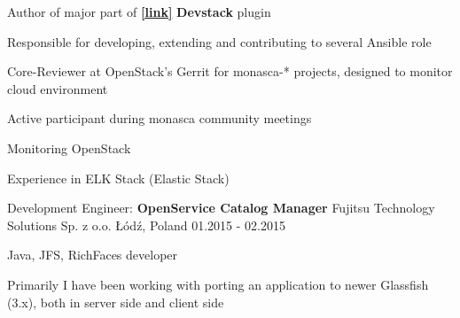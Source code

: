 \begin{cventries}
{\begin{cvitems}
      \item{Author of major part of
          \href{https://github.com/openstack/monasca-log-api}{\textbf{[\faGithubSquare\acvHeaderIconSep link]}} \textbf{Devstack} plugin}
      \item{Responsible for developing, extending and contributing to several Ansible role}
      \item{Core-Reviewer at OpenStack’s Gerrit for monasca-* projects,
          designed to monitor cloud environment}
      \item{Active participant during monasca community meetings}
      \item{Monitoring OpenStack}
      \item{Experience in ELK Stack (Elastic Stack)}
    \end{cvitems}
  }

  \cventry
  {Development Engineer: \textbf{OpenService Catalog Manager}}
  {Fujitsu Technology Solutions Sp. z o.o.}
  {Łódź, Poland}
  {01.2015 - 02.2015}
  {
    \begin{cvitems}
       \item{Java, JFS, RichFaces developer}
       \item{Primarily I have been working with porting an application
             to newer Glassfish (3.x), both
             in server side and client side}
    \end{cvitems}
  }



\end{cventries}
